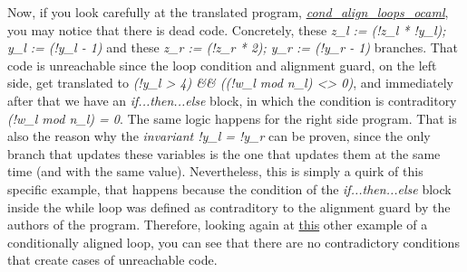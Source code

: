 Now, if you look carefully at the translated program, \hyperref[fig:cond_aligned_ocaml]{\emph{cond\_align\_loops\_ocaml}}, you may notice that there is dead code.
Concretely, these \emph{z\_l := (!z\_l * !y\_l); y\_l := (!y\_l - 1)} and these \emph{z\_r := (!z\_r * 2); y\_r := (!y\_r - 1)} branches.
That code is unreachable since the loop condition and alignment guard, on the left side, get translated to \emph{(!y\_l > 4) \&\& ((!w\_l mod n\_l) <> 0)}, and immediately after that we have an \emph{if...then...else} block, in which the condition is contraditory \emph{(!w\_l mod n\_l) = 0}.
The same logic happens for the right side program.
That is also the reason why the \emph{invariant !y\_l = !y\_r} can be proven, since the only branch that updates these variables is the one that updates them at the same time (and with the same value).
Nevertheless, this is simply a quirk of this specific example, that happens because the condition of the \emph{if...then...else} block inside the while loop was defined as contraditory to the alignment guard by the authors of the program.
Therefore, looking again at \hyperref[fig:trans-ex-third]{this} other example of a conditionally aligned loop, you can see that there are no contradictory conditions that create cases of unreachable code.



